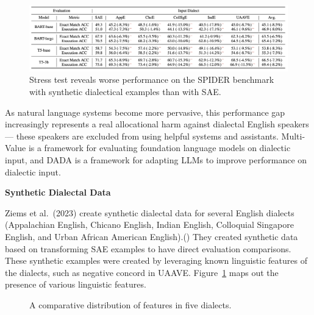 \documentclass[
  letterpaper,
  numbers=noenddot,
  DIV=11]{scrreprt}
\theoremstyle{definition}
\theoremstyle{plain}
\theoremstyle{plain}
\theoremstyle{remark}
\begin{document}
\begin{figure}[H]

{\centering \includegraphics[width=1\textwidth,height=\textheight]{src/Figures/MV2.png}

}

\caption{Stress test reveals worse performance on the SPIDER benchmark
with synthetic dialectical examples than with SAE.}

\end{figure}%

As natural language systems become more pervasive, this performance gap
increasingly represents a real allocational harm against dialectal
English speakers --- these speakers are excluded from using helpful
systems and assistants. Multi-Value is a framework for evaluating
foundation language models on dialectic input, and DADA is a framework
for adapting LLMs to improve performance on dialectic input.

\textbf{Synthetic Dialectal Data}

Ziems et al.~(2023) create synthetic dialectal data for several English
dialects (Appalachian English, Chicano English, Indian English,
Colloquial Singapore English, and Urban African American
English).() They created synthetic
data based on transforming SAE examples to have direct evaluation
comparisons. These synthetic examples were created by leveraging known
linguistic features of the dialects, such as negative concord in UAAVE.
Figure~\ref{fig-features_dialects} maps out the presence of various
linguistic features.

\begin{figure}


\caption{\label{fig-features_dialects}A comparative distribution of
features in five dialects.}

\end{figure}%
\end{document}
